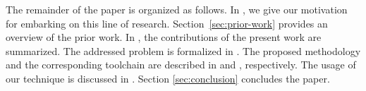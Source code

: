 The remainder of the paper is organized as follows. In , we
give our motivation for embarking on this line of research.
Section~\ref{sec:prior-work} provides an overview of the prior work. In
, the contributions of the present work are summarized. The
addressed problem is formalized in . The proposed
methodology and the corresponding toolchain are described in 
and , respectively. The usage of our technique is discussed in
. Section \ref{sec:conclusion} concludes the paper.
